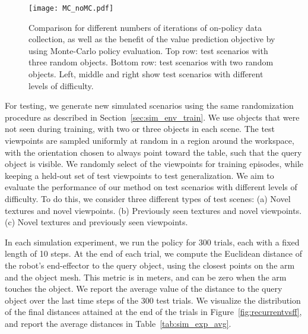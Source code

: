 \documentclass[10pt,twocolumn,letterpaper]{article}
\begin{document}
\begin{figure*}[t]
\begin{center}
\texttt{[image: MC\_noMC.pdf]}
\end{center}
\vspace{-.2in}
\caption{Comparison for different numbers of iterations of on-policy data collection, as well as the benefit of the value prediction objective by using Monte-Carlo policy evaluation. Top row: test scenarios with three random objects. Bottom row: test scenarios with two random objects. Left, middle and right show test scenarios with different levels of difficulty.}
   \vspace{-.05in}
\label{fig:mcnomc}
\end{figure*}
For testing, we generate new simulated scenarios using the same randomization procedure as described in Section~\ref{sec:sim_env_train}. We use objects that were not seen during training, with two or three objects in each scene. The test viewpoints are sampled uniformly at random in a region around the workspace, with the orientation chosen to always point toward the table, such that the query object is visible. We randomly select of the viewpoints for training episodes, while keeping a held-out set of test viewpoints to test generalization. We aim to evaluate the performance of our method on test scenarios with different levels of difficulty. To do this, we consider three different types of test scenes: (a) Novel textures and novel viewpoints. (b) Previously seen textures and novel viewpoints. (c) Novel textures and previously seen viewpoints.

 In each simulation experiment, we run the policy for 300 trials, each with a fixed length of 10 steps. At the end of each trial, we compute the Euclidean distance of the robot's end-effector to the query object, using the closest points on the arm and the object mesh. This metric is in meters, and can be zero when the arm touches the object. We report the average value of the distance to the query object over the last time steps of the 300 test trials.
We visualize the distribution of the final distances attained at the end of the trials in Figure~\ref{fig:recurrentvsff}, and report the average distances in Table~\ref{tab:sim_exp_avg}.
\end{document}
